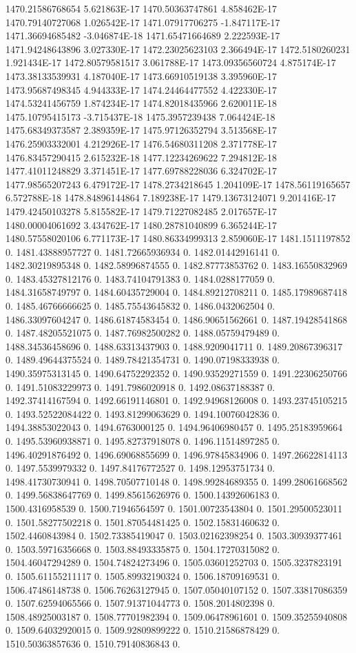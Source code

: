 1470.21586768654  5.621863E-17
1470.50363747861  4.858462E-17
1470.79140727068  1.026542E-17
1471.07917706275  -1.847117E-17
1471.36694685482  -3.046874E-18
1471.65471664689  2.222593E-17
1471.94248643896  3.027330E-17
1472.23025623103  2.366494E-17
1472.5180260231  1.921434E-17
1472.80579581517  3.061788E-17
1473.09356560724  4.875174E-17
1473.38133539931  4.187040E-17
1473.66910519138  3.395960E-17
1473.95687498345  4.944333E-17
1474.24464477552  4.422330E-17
1474.53241456759  1.874234E-17
1474.82018435966  2.620011E-18
1475.10795415173  -3.715437E-18
1475.3957239438  7.064424E-18
1475.68349373587  2.389359E-17
1475.97126352794  3.513568E-17
1476.25903332001  4.212926E-17
1476.54680311208  2.371778E-17
1476.83457290415  2.615232E-18
1477.12234269622  7.294812E-18
1477.41011248829  3.371451E-17
1477.69788228036  6.324702E-17
1477.98565207243  6.479172E-17
1478.2734218645  1.204109E-17
1478.56119165657  6.572788E-18
1478.84896144864  7.189238E-17
1479.13673124071  9.201416E-17
1479.42450103278  5.815582E-17
1479.71227082485  2.017657E-17
1480.00004061692  3.434762E-17
1480.28781040899  6.365244E-17
1480.57558020106  6.771173E-17
1480.86334999313  2.859060E-17
1481.1511197852  0.
1481.43888957727  0.
1481.72665936934  0.
1482.01442916141  0.
1482.30219895348  0.
1482.58996874555  0.
1482.87773853762  0.
1483.16550832969  0.
1483.45327812176  0.
1483.74104791383  0.
1484.0288177059  0.
1484.31658749797  0.
1484.60435729004  0.
1484.89212708211  0.
1485.17989687418  0.
1485.46766666625  0.
1485.75543645832  0.
1486.0432062504  0.
1486.33097604247  0.
1486.61874583454  0.
1486.90651562661  0.
1487.19428541868  0.
1487.48205521075  0.
1487.76982500282  0.
1488.05759479489  0.
1488.34536458696  0.
1488.63313437903  0.
1488.9209041711  0.
1489.20867396317  0.
1489.49644375524  0.
1489.78421354731  0.
1490.07198333938  0.
1490.35975313145  0.
1490.64752292352  0.
1490.93529271559  0.
1491.22306250766  0.
1491.51083229973  0.
1491.7986020918  0.
1492.08637188387  0.
1492.37414167594  0.
1492.66191146801  0.
1492.94968126008  0.
1493.23745105215  0.
1493.52522084422  0.
1493.81299063629  0.
1494.10076042836  0.
1494.38853022043  0.
1494.6763000125  0.
1494.96406980457  0.
1495.25183959664  0.
1495.53960938871  0.
1495.82737918078  0.
1496.11514897285  0.
1496.40291876492  0.
1496.69068855699  0.
1496.97845834906  0.
1497.26622814113  0.
1497.5539979332  0.
1497.84176772527  0.
1498.12953751734  0.
1498.41730730941  0.
1498.70507710148  0.
1498.99284689355  0.
1499.28061668562  0.
1499.56838647769  0.
1499.85615626976  0.
1500.14392606183  0.
1500.4316958539  0.
1500.71946564597  0.
1501.00723543804  0.
1501.29500523011  0.
1501.58277502218  0.
1501.87054481425  0.
1502.15831460632  0.
1502.4460843984  0.
1502.73385419047  0.
1503.02162398254  0.
1503.30939377461  0.
1503.59716356668  0.
1503.88493335875  0.
1504.17270315082  0.
1504.46047294289  0.
1504.74824273496  0.
1505.03601252703  0.
1505.3237823191  0.
1505.61155211117  0.
1505.89932190324  0.
1506.18709169531  0.
1506.47486148738  0.
1506.76263127945  0.
1507.05040107152  0.
1507.33817086359  0.
1507.62594065566  0.
1507.91371044773  0.
1508.2014802398  0.
1508.48925003187  0.
1508.77701982394  0.
1509.06478961601  0.
1509.35255940808  0.
1509.64032920015  0.
1509.92809899222  0.
1510.21586878429  0.
1510.50363857636  0.
1510.79140836843  0.

